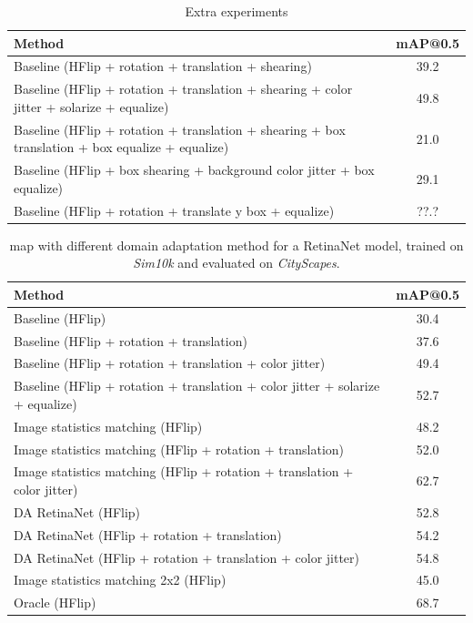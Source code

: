 \documentclass[%
    corpo=12pt,
    twoside,
    stile=classica,   
    tipotesi=magistrale,
    evenboxes,
    english,
	numerazioneromana,
]{toptesi}
\begin{document}

\begin{table}[ht!]
	\centering
	\begin{tabularx}{\linewidth}{|X|c|}
		\hline
		Method  &   mAP@0.5 \\
		\hline\hline
		Baseline (HFlip + rotation + translation + shearing)      &   39.2   \\
		\hline
		Baseline (HFlip + rotation + translation + shearing + color jitter + solarize + equalize)      &   49.8   \\
		\hline
		Baseline (HFlip + rotation + translation + shearing + box translation + box equalize + equalize)      &   21.0   \\
		\hline
		Baseline (HFlip + box shearing + background color jitter + box equalize)      &   29.1   \\
		\hline
		Baseline (HFlip + rotation + translate y box + equalize)      &   ??.?   \\
		\hline
	\end{tabularx}
	\caption{Extra experiments}
	\label{table:extra}
\end{table}

\begin{table}[ht!]
	\centering
	\begin{tabularx}{\linewidth}{|X|c|}
		\hline
		Method  &   mAP@0.5 \\
		\hline\hline
		Baseline (HFlip)       &   30.4   \\
		\hline
		Baseline (HFlip + rotation + translation)      &   37.6   \\
		\hline
		Baseline (HFlip + rotation + translation + color jitter)      &   49.4   \\
		\hline
		Baseline (HFlip + rotation + translation + color jitter + solarize + equalize)      &   52.7   \\
		\hline
		Image statistics matching (HFlip)  &   48.2    \\
		\hline
		Image statistics matching (HFlip + rotation + translation)  &   52.0    \\
		\hline
		Image statistics matching (HFlip + rotation + translation + color jitter)  &   62.7    \\
		\hline
		DA RetinaNet (HFlip)   &   52.8    \\
		\hline
		DA RetinaNet (HFlip + rotation + translation)   &   54.2    \\
		\hline
		DA RetinaNet (HFlip + rotation + translation + color jitter)   &   54.8    \\
		\hline\hline
		Image statistics matching 2x2 (HFlip) &   45.0    \\
		\hline\hline
		Oracle (HFlip) &   68.7    \\
		\hline
	\end{tabularx}
	\caption{\gls{map} with different domain adaptation method for a RetinaNet model, trained on \textit{Sim10k} and evaluated on \textit{CityScapes}.}
	\label{table:retinanet}
\end{table}
\end{document}
